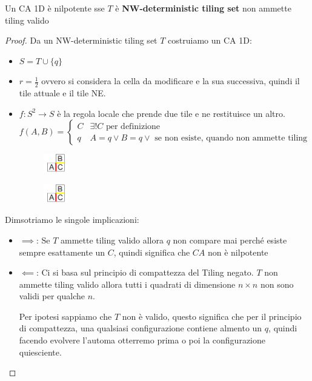 \begin{teorema} 
    Un CA 1D è nilpotente sse  $T$ è \textbf{NW-deterministic tiling set} non ammette tiling
    valido
    \begin{proof}
        Da un NW-deterministic tiling set $T$ costruiamo un CA 1D:
        \begin{itemize}
            \item $S= T\cup \{q\}$
            \item $r=\frac{1}{2}$ ovvero si considera la cella da modificare e
                  la sua successiva, quindi il tile attuale e il tile NE.
            \item $f:S^2\rightarrow S$ è la regola locale che prende due tile
                  e ne restituisce un altro.
                  $$f(A,B) = \begin{cases}
                          C & \exists ! C \text{ per definizione}                             \\
                          q & A=q\lor B=q\lor\text{ se non esiste, quando non ammette tiling}
                      \end{cases}$$
                  \begin{figure}
                      \centering
                      \includegraphics[width=0.1\textwidth]{img/sistemi_complessi/tileset.png}
                  \end{figure}
                  \begin{figure}
                      \centering
                      \includegraphics[width=0.1\textwidth]{img/sistemi_complessi/tileset.png}
                  \end{figure}
        \end{itemize}
        Dimsotriamo le singole implicazioni:
        \begin{itemize}
            \item $\implies$: Se $T$ ammette tiling valido allora $q$ non compare
                  mai perché esiste sempre esattamente un $C$, quindi significa che $CA$
                  non è nilpotente
            \item $\impliedby$: Ci si basa sul principio di compattezza del Tiling
                  negato. $T$ non ammette tiling valido allora tutti i quadrati di dimensione
                  $n\times n$ non sono validi per qualche $n$.

                  Per ipotesi sappiamo che $T$ non è valido, questo significa che
                  per il principio di compattezza, una qualsiasi configurazione contiene
                  almento un $q$, quindi facendo evolvere l'automa otterremo prima o poi
                  la configurazione quiesciente.
        \end{itemize}
    \end{proof}
\end{teorema}

